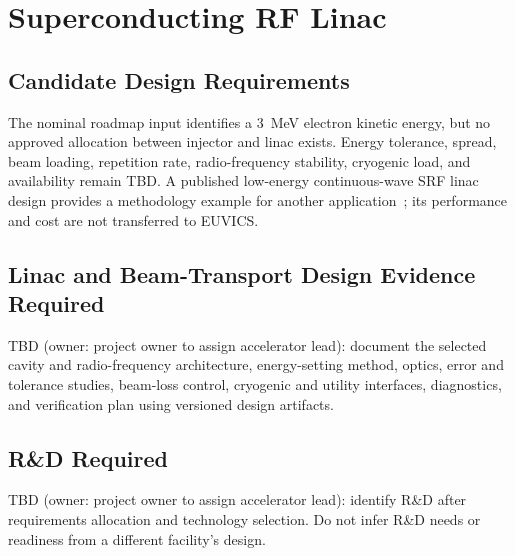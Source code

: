 \section{Superconducting RF Linac}

\subsection{Candidate Design Requirements}

The nominal roadmap input identifies a 3~MeV electron kinetic energy, but no
approved allocation between injector and linac exists. Energy tolerance, spread,
beam loading, repetition rate, radio-frequency stability, cryogenic load, and
availability remain TBD. A published low-energy continuous-wave SRF linac design
provides a methodology example for another application~\cite{CiovatiEtAl2018LowEnergySRFLinac};
its performance and cost are not transferred to EUVICS.

\subsection{Linac and Beam-Transport Design Evidence Required}

TBD (owner: project owner to assign accelerator lead): document the selected
cavity and radio-frequency architecture, energy-setting method, optics, error and
tolerance studies, beam-loss control, cryogenic and utility interfaces, diagnostics,
and verification plan using versioned design artifacts.

\subsection{R\&D Required}

TBD (owner: project owner to assign accelerator lead): identify R\&D after
requirements allocation and technology selection. Do not infer R\&D needs or
readiness from a different facility's design.

\blankline
\blankline

